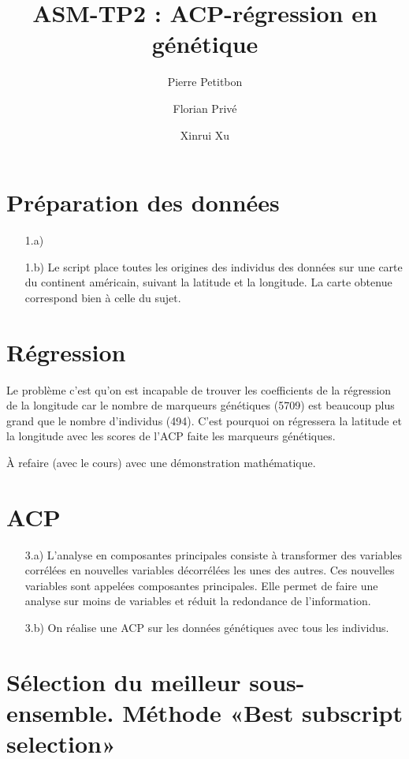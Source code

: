 \documentclass[a4paper, 12pt]{article}
\title{ASM-TP2 : ACP-régression en génétique}
\author{Pierre Petitbon \and Florian Privé \and Xinrui Xu}
\date{}
\begin{document}
\maketitle

\section{Préparation des données}

\begin{enumerate}
\setlength{\itemsep}{20pt}

\item[1.a)] 
\item[1.b)] 
Le script place toutes les origines des individus des données sur une carte du continent américain, suivant la latitude et la longitude. La carte obtenue correspond bien à celle du sujet. 
\end{enumerate}



\section{Régression}
Le problème c'est qu'on est incapable de trouver les coefficients de la régression de la longitude car le nombre de marqueurs génétiques (5709) est beaucoup plus grand que le nombre d'individus (494). C'est pourquoi on régressera la latitude et la longitude avec les scores de l'ACP faite les marqueurs génétiques. 

À refaire (avec le cours) avec une démonstration mathématique.

\section{ACP}
\begin{enumerate}
\setlength{\itemsep}{20pt}
\item[3.a)]
 L'analyse en composantes principales consiste à transformer des variables corrélées en nouvelles variables décorrélées les unes des autres. Ces nouvelles variables sont appelées composantes principales. Elle permet de faire une analyse sur moins de variables et réduit la redondance de l'information. 

 \item[3.b)]
 On réalise une ACP sur les données génétiques avec tous les individus.

\end{enumerate}


\section{Sélection du meilleur sous-ensemble. Méthode «Best subscript selection»}
\end{document}
